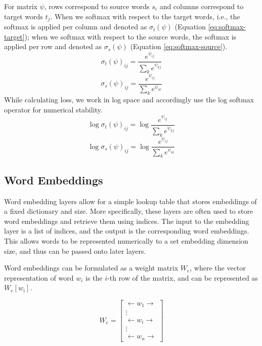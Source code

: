 \documentclass[twoside,twocolumn]{article}
\begin{document}
For matrix $\psi$, rows correspond to source words $s_i$ and columns correspond
to target words $t_j$. When we softmax with respect to the target words, i.e.,
the softmax is applied per column and denoted as $\sigma_t(\psi)$
(Equation \ref{eq:softmax-target}); when we softmax with respect to the source
words, the softmax is applied per row and denoted as $\sigma_s(\psi)$
(Equation \ref{eq:softmax-source}).
\begin{equation}
  \label{eq:softmax-target}
  \sigma_t(\psi)_{ij} = \frac{e^{\psi_{ij}}}{\sum_{k} e^{\psi_{kj}}}
\end{equation}
\begin{equation}
  \label{eq:softmax-source}
  \sigma_s(\psi)_{ij} = \frac{e^{\psi_{ij}}}{\sum_{k} e^{\psi_{ik}}}
\end{equation}
While calculating loss, we work in log space and accordingly use the log
softmax operator for numerical stability.
\begin{equation}
  \log \sigma_t(\psi)_{ij} = \log \frac{e^{\psi_{ij}}}{\sum_{k} e^{\psi_{kj}}}
\end{equation}
\begin{equation}
  \log \sigma_s(\psi)_{ij} = \log \frac{e^{\psi_{ij}}}{\sum_{k} e^{\psi_{ik}}}
\end{equation}

\subsection{Word Embeddings}
Word embedding layers allow for a simple lookup table that stores embeddings
of a fixed dictionary and size. More specifically, these layers are often used
to store word embeddings and retrieve them using indices. The input to the
embedding layer is a list of indices, and the output is the corresponding
word embeddings. This allows words to be represented numerically to a set
embedding dimension size, and thus can be passed onto later layers.

Word embeddings can be formulated as a weight matrix $W_e$, where the
vector representation of word $w_i$ is the $i$-th row of the matrix, and
can be represented as $W_e[w_i]$.

\begin{equation}
  W_e = \begin{bmatrix}
  \longleftarrow w_1 \longrightarrow \\
  \vdots\\
  \longleftarrow w_i \longrightarrow\\
  \vdots\\
  \longleftarrow w_n \longrightarrow
\end{bmatrix}
\end{equation}
\end{document}
